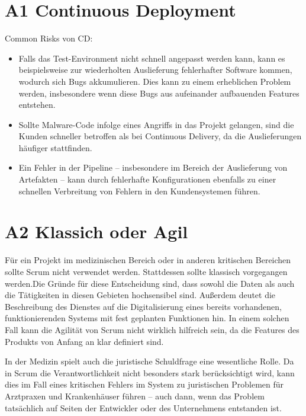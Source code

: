 \documentclass[12pt]{article}
\begin{document}
\section*{A1 Continuous Deployment}

Common Risks von CD: 

\begin{itemize}

\item Falls das Test-Environment nicht schnell angepasst werden kann, kann es beispielsweise zur wiederholten Auslieferung fehlerhafter Software kommen, wodurch sich Bugs akkumulieren. Dies kann zu einem erheblichen Problem werden, insbesondere wenn diese Bugs aus aufeinander aufbauenden Features entstehen.

\item Sollte Malware-Code infolge eines Angriffs in das Projekt gelangen, sind die Kunden schneller betroffen als bei Continuous Delivery, da die Auslieferungen häufiger stattfinden.

\item Ein Fehler in der Pipeline – insbesondere im Bereich der Auslieferung von Artefakten – kann durch fehlerhafte Konfigurationen ebenfalls zu einer schnellen Verbreitung von Fehlern in den Kundensystemen führen.

\end{itemize}

\section*{A2 Klassich oder Agil}

Für ein Projekt im medizinischen Bereich oder in anderen kritischen Bereichen sollte Scrum nicht verwendet werden. Stattdessen sollte klassisch 
vorgegangen werden.Die Gründe für diese Entscheidung sind, dass sowohl die Daten als auch die Tätigkeiten in diesen Gebieten 
hochsensibel sind. Außerdem deutet die Beschreibung des Dienstes auf die Digitalisierung eines bereits vorhandenen, funktionierenden Systems mit fest geplanten Funktionen hin. 
In einem solchen Fall kann die Agilität von Scrum nicht wirklich hilfreich sein, da die Features des Produkts von Anfang an klar definiert sind.

In der Medizin spielt auch die juristische Schuldfrage eine wesentliche Rolle. Da in Scrum die Verantwortlichkeit nicht besonders stark berücksichtigt wird, kann dies im 
Fall eines kritischen Fehlers im System zu juristischen Problemen für Arztpraxen und Krankenhäuser führen – auch dann, wenn das Problem tatsächlich auf Seiten der Entwickler oder des 
Unternehmens entstanden ist.
\end{document}
